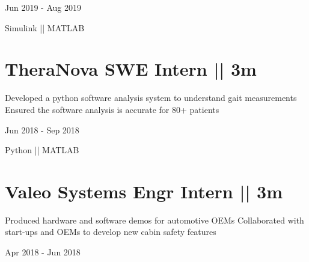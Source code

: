 \documentclass[letterpaper,10pt,oneside]{article}
\begin{document}
\begin{body}
\begin{subtitle}
\vspace{-5ex}
{{Jun 2019 - Aug 2019}} 
\end{subtitle}

\vspace{-1.5ex}
{
\vspace{-0.8ex}
\color{cyan}\small
{Simulink || MATLAB} %
}

\section
{\textbf{TheraNova}
\newline
SWE Intern || 3m
}

\BulletItem
\vspace{-2.5ex}
\begin{detail}

\BulletItem
 Developed a python software analysis system to understand gait measurements
\BulletItem
 Ensured the software analysis is accurate for 80+ patients
\end{detail}

\begin{subtitle}
\vspace{-7.8ex}
{{Jun 2018 - Sep 2018}}
\end{subtitle}
\vspace{0ex}

\vspace{-1.5ex}
{
\vspace{1.8ex}
\color{cyan}\small
{Python || MATLAB} %
}
\vspace{-1.5ex}

\section
{\textbf{Valeo}
\newline
Systems Engr Intern || 3m}

\BulletItem
\vspace{-2.5ex}
\begin{detail}
\BulletItem
 Produced hardware and software demos for automotive OEMs
\BulletItem
 Collaborated with start-ups and OEMs to develop new cabin safety features
\end{detail}

\begin{subtitle}
\vspace{-7.8ex}
{{Apr 2018 - Jun 2018}}
\end{subtitle}


\end{body}
\end{document}
